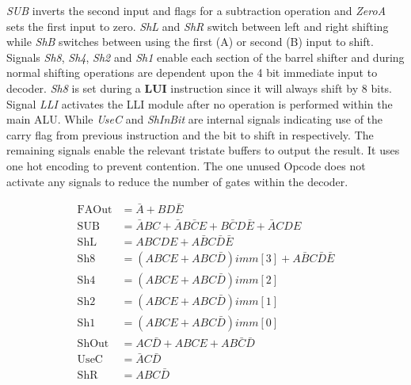 \textit{SUB} inverts the second input and flags for a subtraction operation and \textit{ZeroA} sets the first input to zero. 
\textit{ShL} and \textit{ShR} switch between left and right shifting while \textit{ShB} switches between using the first (A) or second (B) input to shift. 
Signals \textit{Sh8}, \textit{Sh4}, \textit{Sh2} and \textit{Sh1} enable each section of the barrel shifter and during normal shifting operations are dependent upon the 4 bit immediate input to decoder. 
\textit{Sh8} is set during a \textbf{LUI} instruction since it will always shift by 8 bits. 
Signal \textit{LLI} activates the LLI module after no operation is performed within the main ALU. 
While \textit{UseC} and \textit{ShInBit} are internal signals indicating use of the carry flag from previous instruction and the bit to shift in respectively. 
The remaining signals enable the relevant tristate buffers to output the result. It uses one hot encoding to prevent contention. 
The one unused Opcode does not activate any signals to reduce the number of gates within the decoder. 

\begin{align}
	\text{FAOut} &= \bar{A} + BD\bar{E} \label{eq:DecBasicS}\\
	\text{SUB} &= \bar{A}BC + \bar{A}B\bar{C}E + B\bar{C}D\bar{E} + \bar{A}CDE \\
	\text{ShL} &= ABCDE + A\bar{B}C\bar{D}\bar{E} \\
	\text{Sh8} &= (ABCE + ABC\bar{D})imm[3] + A\bar{B}C\bar{D}\bar{E} \\
	\text{Sh4} &= (ABCE + ABC\bar{D})imm[2] \\
	\text{Sh2} &= (ABCE + ABC\bar{D})imm[1] \\
	\text{Sh1} &= (ABCE + ABC\bar{D})imm[0] \\
	\text{ShOut} &= AC\bar{D} + ABCE + AB\bar{C}\bar{D} \\
	\text{UseC} &= \bar{A}C\bar{D} \\
	\text{ShR} &= ABC\bar{D} \label{eq:DecBasicF}
\end{align}

